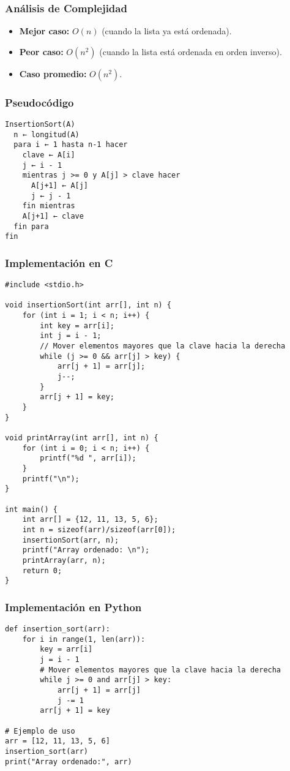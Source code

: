 \documentclass[11pt,openany]{book}
\begin{document}
\subsubsection{Análisis de Complejidad}
\begin{itemize}
    \item \textbf{Mejor caso:} $O(n)$ (cuando la lista ya está ordenada).
    \item \textbf{Peor caso:} $O(n^2)$ (cuando la lista está ordenada en orden inverso).
    \item \textbf{Caso promedio:} $O(n^2)$.
\end{itemize}

\subsubsection{Pseudocódigo}
\begin{verbatim}
InsertionSort(A)
  n ← longitud(A)
  para i ← 1 hasta n-1 hacer
    clave ← A[i]
    j ← i - 1
    mientras j >= 0 y A[j] > clave hacer
      A[j+1] ← A[j]
      j ← j - 1
    fin mientras
    A[j+1] ← clave
  fin para
fin
\end{verbatim}

\subsubsection{Implementación en C}
\lstset{language=C}
\begin{lstlisting}
#include <stdio.h>

void insertionSort(int arr[], int n) {
    for (int i = 1; i < n; i++) {
        int key = arr[i];
        int j = i - 1;
        // Mover elementos mayores que la clave hacia la derecha
        while (j >= 0 && arr[j] > key) {
            arr[j + 1] = arr[j];
            j--;
        }
        arr[j + 1] = key;
    }
}

void printArray(int arr[], int n) {
    for (int i = 0; i < n; i++) {
        printf("%d ", arr[i]);
    }
    printf("\n");
}

int main() {
    int arr[] = {12, 11, 13, 5, 6};
    int n = sizeof(arr)/sizeof(arr[0]);
    insertionSort(arr, n);
    printf("Array ordenado: \n");
    printArray(arr, n);
    return 0;
}
\end{lstlisting}

\subsubsection{Implementación en Python}
\lstset{language=Python}
\begin{lstlisting}
def insertion_sort(arr):
    for i in range(1, len(arr)):
        key = arr[i]
        j = i - 1
        # Mover elementos mayores que la clave hacia la derecha
        while j >= 0 and arr[j] > key:
            arr[j + 1] = arr[j]
            j -= 1
        arr[j + 1] = key

# Ejemplo de uso
arr = [12, 11, 13, 5, 6]
insertion_sort(arr)
print("Array ordenado:", arr)
\end{lstlisting}
\end{document}
